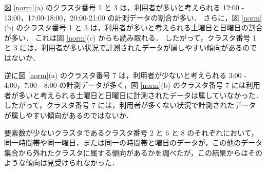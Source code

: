 \documentclass[a4j]{jarticle}
\begin{document}
図 \ref{norm}(a) のクラスタ番号 1 と 3 は，利用者が多いと考えられる 12:00 - 13:00，17:00-18:00，20:00-21:00 の計測データの割合が多い．
さらに，図 \ref{norm}(b) のクラスタ番号 1 と 3 は，利用者が多いと考えられる土曜日と日曜日の割合が多い．
これは図 \ref{norm}(c) からも読み取れる．
したがって，クラスタ番号 1 と 3 には，利用者が多い状況で計測されたデータが属しやすい傾向があるのではないか．

逆に図 \ref{norm}(a) のクラスタ番号 7 は，利用者が少ないと考えられる 3:00 - 4:00，7:00 - 8:00 の計測データが多く，図 \ref{norm}(b) のクラスタ番号 7 には利用者が多いと考えられる土曜日と日曜日に計測されたデータは属していなかった．
したがって，クラスタ番号 7 には，利用者が多くない状況で計測されたデータが属しやすい傾向があるのではないか．

要素数が少ないクラスタであるクラスタ番号 2 と 6 と 8 のそれぞれにおいて，同一時間帯や同一曜日，または同一の時間帯と曜日のデータが，この他のデータ集合から外れたクラスタに属する傾向があるかを調べたが，この結果からはそのような傾向は見受けられなかった．

\newpage
\end{document}
